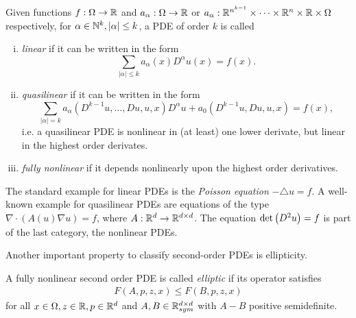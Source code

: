 \begin{definition} \label{def: categories of PDEs}
	Given functions  $f:\Omega \rightarrow \mathbb{R}$ and $a_{\alpha}:\Omega \rightarrow \mathbb{R}$ or $a_{\alpha}:\mathbb{R}^{n^{k-1}} \times \dots \times \mathbb{R}^n \times \mathbb{R} \times \Omega$ respectively, for $\alpha \in \mathbb{N}^{k}, |\alpha| \leq k$, a PDE of order $k$ is called
	\begin{enumerate}[(i)]
		\item \emph{linear} if it can be written in the form
		\[
			\sum_{|\alpha| \leq k} a_{\alpha} (x) D^{\alpha} u(x) = f(x).
		\] 
		
		
		\item \emph{quasilinear} if it can be written in the form
		\[
			\sum_{|\alpha| = k} a_{\alpha}(D^{k-1}u, \dots, Du, u, x) D^{\alpha} u + a_0(D^{k-1}u, Du, u, x)= f(x),
		\]	
		i.e. a quasilinear PDE is nonlinear in (at least) one lower derivate, but linear in the highest order derivates.
		
		\item \emph{fully nonlinear} if it depends nonlinearly upon the highest order derivatives.
	\end{enumerate}
\end{definition}
The standard example for linear PDEs is the \emph{Poisson equation} $-\triangle u = f$.
A well-known example for quasilinear PDEs are equations of the type $\nabla \cdot (A(u) \nabla u) = f$, where $A: \mathbb{R}^d \rightarrow \mathbb{R}^{d \times d}  $. The \MA equation $\det{\left(D^2 u\right)} = f$ is part of the last category, the nonlinear PDEs. 

Another important property to classify second-order PDEs is ellipticity. 
\begin{definition}
	A fully nonlinear second order PDE is called \emph{elliptic} if its operator satisfies
	\begin{align}
		F(A,p,z,x) \leq F(B,p,z,x) \label{eq: ellipitic PDE}
	\end{align}
for all $x \in \Omega, z \in \mathbb{R}, p \in \mathbb{R}^d$ and $A,B \in \mathbb{R}^{d \times d}_{sym}$  with $A-B$ positive semidefinite.

\end{definition}

